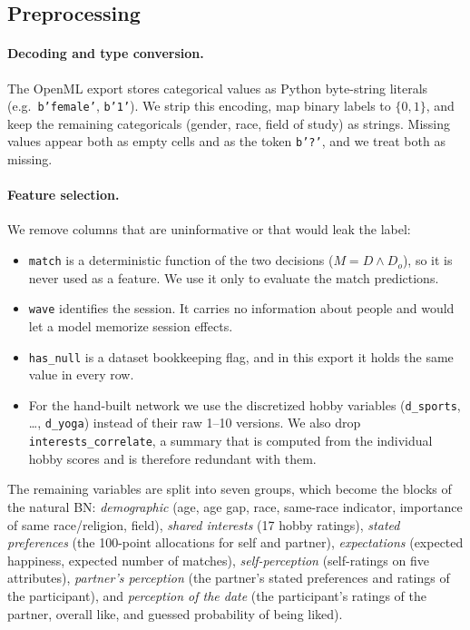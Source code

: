 \documentclass{article}
\begin{document}
\subsection{Preprocessing}

\paragraph{Decoding and type conversion.}
The OpenML export stores categorical values as Python byte-string literals
(e.g.\ \texttt{b'female'}, \texttt{b'1'}). We strip this encoding, map binary
labels to $\{0,1\}$, and keep the remaining categoricals (gender, race,
field of study) as strings. Missing values appear both as empty cells and as the
token \texttt{b'?'}, and we treat both as missing.

\paragraph{Feature selection.}
We remove columns that are uninformative or that would leak the label:
\begin{itemize}
  \item \texttt{match} is a deterministic function of the two decisions
        ($M = D \wedge D_o$), so it is never used as a feature. We use it
        only to evaluate the match predictions.
  \item \texttt{wave} identifies the session. It carries no information
        about people and would let a model memorize session effects.
  \item \texttt{has\_null} is a dataset bookkeeping flag, and in this export it
        holds the same value in every row.
  \item For the hand-built network we use the discretized hobby
        variables (\texttt{d\_sports}, \ldots, \texttt{d\_yoga}) instead of
        their raw 1--10 versions. We also drop \texttt{interests\_correlate},
        a summary that is computed from the individual hobby scores and is
        therefore redundant with them.
\end{itemize}
The remaining variables are split into seven groups, which become the
blocks of the natural BN: \emph{demographic} (age, age gap, race,
same-race indicator, importance of same race/religion, field),
\emph{shared interests} (17 hobby ratings), \emph{stated preferences}
(the 100-point allocations for self and partner),
\emph{expectations} (expected happiness, expected number of matches),
\emph{self-perception} (self-ratings on five attributes), \emph{partner's
perception} (the partner's stated preferences and ratings of the participant),
and \emph{perception of the date} (the participant's ratings of the partner,
overall like, and guessed probability of being liked).
\end{document}
